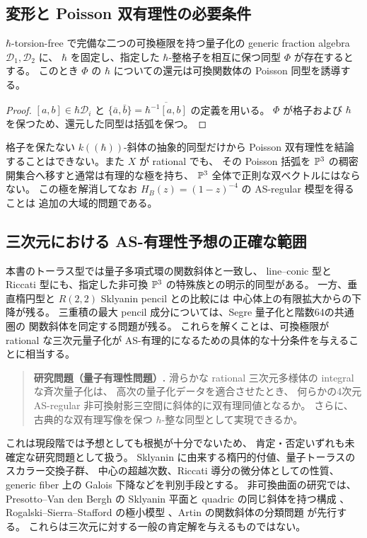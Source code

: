 \subsection{変形と Poisson 双有理性の必要条件}
\begin{proposition}[半古典極限の必要条件]\label{prop:semiclassical-necessity}
$\hbar$-torsion-free で完備な二つの可換極限を持つ量子化の
generic fraction algebra $\mathscr D_1,\mathscr D_2$ に、
$\hbar$ を固定し、指定した $\hbar$-整格子を相互に保つ同型 $\Phi$ が存在するとする。
このとき $\Phi$ の $\hbar$ についての還元は可換関数体の Poisson 同型を誘導する。
\end{proposition}
\begin{proof}
$[a,b]\in\hbar\mathscr D_i$ と
$\{\bar a,\bar b\}=\overline{\hbar^{-1}[a,b]}$ の定義を用いる。
$\Phi$ が格子および $\hbar$ を保つため、還元した同型は括弧を保つ。
\end{proof}
\begin{remark}
格子を保たない $k((\hbar))$-斜体の抽象的同型だけから
Poisson 双有理性を結論することはできない。また $X$ が rational でも、
その Poisson 括弧を $\mathbb P^3$ の稠密開集合へ移すと通常は有理的な極を持ち、
$\mathbb P^3$ 全体で正則な双ベクトルにはならない。
この極を解消してなお $H_B(z)=(1-z)^{-4}$ の AS-regular 模型を得ることは
追加の大域的問題である。
\end{remark}

\subsection{三次元における AS-有理性予想の正確な範囲}
本書のトーラス型では量子多項式環の関数斜体と一致し、
line--conic 型と Riccati 型にも、指定した非可換 $\mathbb P^3$ の特殊族との明示的同型がある。
一方、垂直楕円型と $R(2,2)$ Sklyanin pencil との比較には
中心体上の有限拡大からの下降が残る。
三重積の最大 pencil 成分については、Segre 量子化と階数64の共通圏の
関数斜体を同定する問題が残る。
これらを解くことは、可換極限が rational な三次元量子化が
AS-有理的になるための具体的な十分条件を与えることに相当する。

\begin{quote}
\textbf{研究問題（量子有理性問題）.}
滑らかな rational 三次元多様体の integral な斉次量子化は、
高次の量子化データを適合させたとき、
何らかの4次元 AS-regular 非可換射影三空間に斜体的に双有理同値となるか。
さらに、古典的な双有理写像を保つ $\hbar$-整な同型として実現できるか。
\end{quote}
これは現段階では予想としても根拠が十分でないため、
肯定・否定いずれも未確定な研究問題として扱う。
Sklyanin に由来する楕円的付値、量子トーラスのスカラー交換子群、
中心の超越次数、Riccati 導分の微分体としての性質、
generic fiber 上の Galois 下降などを判別手段とする。
非可換曲面の研究では、Presotto--Van den Bergh の
Sklyanin 平面と quadric の同じ斜体を持つ構成
\cite{PVdB2016}、Rogalski--Sierra--Stafford の極小模型
\cite{RogalskiSierraStafford2020}、Artin の関数斜体の分類問題
\cite{StaffordVanDenBergh2001} が先行する。
これらは三次元に対する一般の肯定解を与えるものではない。
